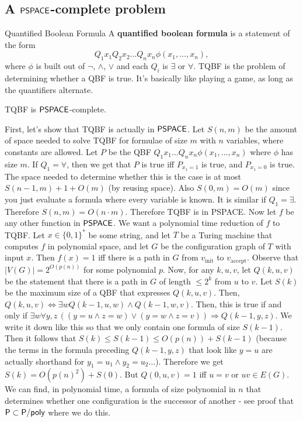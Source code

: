 \documentclass{article}
\begin{document}
\subsection{A $\mathsf{PSPACE}$-complete problem}
\begin{fancydefine}{Quantified Boolean Formula}
    A \textbf{quantified boolean formula} is a statement of the form \[ Q_{1}x_{1}Q_{2}x_{2}\dots Q_{n}x_{n} \phi(x_{1},\dots,x_{n}),\] where $\phi$ is built out of $\neg$, $\wedge$, $\vee$ and each $Q_{i}$ is $\exists$ or $\forall$.\gap 
    TQBF is the problem of determining whether a QBF is true. It's basically like playing a game, as long as the quantifiers alternate.
\end{fancydefine}
\begin{fancythm}{}
    TQBF is $\mathsf{PSPACE}$-complete.
\end{fancythm}
\proof First, let's show that TQBF is actually in $\mathsf{PSPACE}$. Let $S(n,m)$ be the amount of space needed to solve TQBF for formulae of size $m$ with $n$ variables, where constants are allowed. Let $P$ be the QBF $Q_{1}x_{1}\dots Q_{n}x_{n} \phi(x_{1},\dots,x_{n})$ where $\phi$ has size $m$. \gap 
If $Q_{1} = \forall$, then we get that $P$ is true iff $P_{x_{1}=1}$ is true, and $P_{x_{1}=0}$ is true. The space needed to determine whether this is the case is at most $S(n-1,m)+1 +O(m)$ (by reusing space). Also $S(0,m) = O(m)$ since you just evaluate a formula where every variable is known. It is similar if $Q_{1} = \exists$. Therefore $S(n,m)=O(n \cdot m)$. Therefore TQBF is in PSPACE.\gap 
Now let $f$ be any other function in $\mathsf{PSPACE}$. We want a polynomial time reduction of $f$ to TQBF. Let $x \in \{0,1\}^{*}$ be some string, and let $T$ be a Turing machine that computes $f$ in polynomial space, and let $G$ be the configuration graph of $T$ with input $x$. Then $f(x)=1$ iff there is a path in $G$ from $v_{\text{init}}$ to $v_{\text{accept}}$. Observe that $|V(G)|=2^{O(p(n))}$ for some polynomial $p$. \gap 
Now, for any $k,u,v$, let $Q(k,u,v)$ be the statement that there is a path in $G$ of length $\leq 2^{k}$ from $u$ to $v$. Let $S(k)$ be the maximum size of a QBF that expresses $Q(k,u,v)$.\gap 
Then, $Q(k,u,v) \Leftrightarrow \exists w Q(k-1,u,w) \wedge Q(k-1,w,v)$. Then, this is true if and only if $\exists w \forall y,z\, \left((y=u \wedge z=w) \vee (y=w \wedge z=v)\right) \Rightarrow Q(k-1,y,z)$. We write it down like this so that we only contain one formula of size $S(k-1)$. Then it follows that $S(k) \leq S(k-1)\leq O(p(n)) + S(k-1)$ (because the terms in the formula preceding $Q(k-1,y,z)$ that look like $y=u$ are actually shorthand for $y_{1}=u_{1} \wedge y_{2} = u_{2} \dots$). Therefore we get $S(k)=O(p(n)^{2}) + S(0)$. But $Q(0,u,v)=1$ iff $u=v$ or $uv \in E(G)$. We can find, in polynomial time, a formula of size polynomial in $n$ that determines whether one configuration is the successor of another - see proof that $\mathsf{P} \subset \mathsf{P/poly}$ where we do this. \endproof
\end{document}
